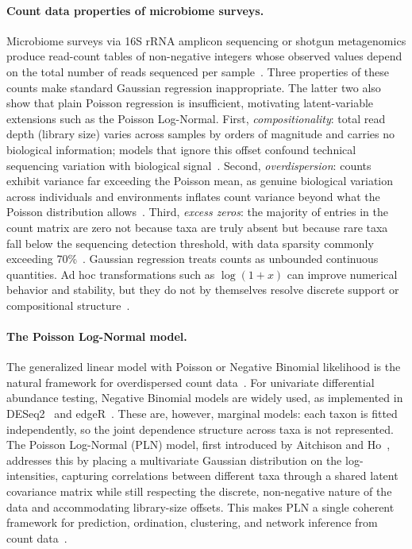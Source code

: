 \documentclass{jmlr}
\begin{document}
\paragraph{Count data properties of microbiome surveys.}
Microbiome surveys via 16S rRNA amplicon sequencing or shotgun metagenomics produce read-count tables of non-negative integers whose observed values depend on the total number of reads sequenced per sample~\cite{HMP2012, Thompson2017, Xia2023}.
Three properties of these counts make standard Gaussian regression inappropriate. 
The latter two also show that plain Poisson regression is insufficient, motivating latent-variable extensions such as the Poisson Log-Normal.
First, \emph{compositionality}: total read depth (library size) varies across samples by orders of magnitude and carries no biological information; models that ignore this offset confound technical sequencing variation with biological signal~\cite{mcmurdie2014waste, Xia2023}.
Second, \emph{overdispersion}: counts exhibit variance far exceeding the Poisson mean, as genuine biological variation across individuals and environments inflates count variance beyond what the Poisson distribution allows~\cite{zhang2017nbmm, McCullaghNelder1989}. 
Third, \emph{excess zeros}: the majority of entries in the count matrix are zero not because taxa are truly absent but because rare taxa fall below the sequencing detection threshold, with data sparsity commonly exceeding 70\%~\cite{Batardiere2025ZIPLN, Kodikara2022}.
Gaussian regression treats counts as unbounded continuous quantities.
Ad hoc transformations such as $\log(1+x)$ can improve numerical behavior and stability, but they do not by themselves resolve discrete support or compositional structure~\cite{booeshaghi2021log1p}.

\paragraph{The Poisson Log-Normal model.}
The generalized linear model with Poisson or Negative Binomial likelihood is the natural framework for overdispersed count data~\cite{McCullaghNelder1989}.
For univariate differential abundance testing, Negative Binomial models are widely used, as implemented in DESeq2~\cite{Love2014DESeq2} and edgeR~\cite{Robinson2010edgeR}.
These are, however, marginal models: each taxon is fitted independently, so the joint dependence structure across taxa is not represented.
The Poisson Log-Normal (PLN) model, first introduced by Aitchison and Ho~\cite{aitchison1989multivariate}, addresses this by placing a multivariate Gaussian distribution on the log-intensities, capturing correlations between different taxa through a shared latent covariance matrix while still respecting the discrete, non-negative nature of the data and accommodating library-size offsets.
This makes PLN a single coherent framework for prediction, ordination, clustering, and network inference from count data~\cite{Chiquet2021, Subedi2025}.
\end{document}
